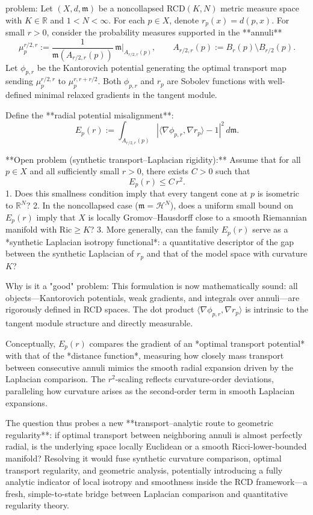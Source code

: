problem:  
Let \((X,d,\mathfrak{m})\) be a noncollapsed RCD\((K,N)\) metric measure space with \(K\in\mathbb{R}\) and \(1<N<\infty\).  
For each \(p\in X\), denote \(r_p(x)=d(p,x)\).  
For small \(r>0\), consider the probability measures supported in the **annuli**
\[
\mu_{p}^{r/2,r}:=\frac{1}{\mathfrak{m}(A_{r/2,r}(p))}\,\mathfrak{m}|_{A_{r/2,r}(p)},
\qquad
A_{r/2,r}(p):=B_r(p)\setminus B_{r/2}(p).
\]
Let \(\phi_{p,r}\) be the Kantorovich potential generating the optimal transport map sending \(\mu_{p}^{r/2,r}\) to \(\mu_{p}^{r,r+ r/2}\).  
Both \(\phi_{p,r}\) and \(r_p\) are Sobolev functions with well-defined minimal relaxed gradients in the tangent module.

Define the **radial potential misalignment**:
\[
E_p(r):=\int_{A_{r/2,r}(p)} |\langle \nabla \phi_{p,r}, \nabla r_p\rangle - 1|^2\, d\mathfrak{m}.
\]

**Open problem (synthetic transport–Laplacian rigidity):**  
Assume that for all \(p\in X\) and all sufficiently small \(r>0\),
there exists \(C>0\) such that
\[
E_p(r)\le C\,r^2 .
\]
1. Does this smallness condition imply that every tangent cone at \(p\) is isometric to \(\mathbb{R}^N\)?  
2. In the noncollapsed case (\(\mathfrak{m}=\mathcal{H}^N\)), does a uniform small bound on \(E_p(r)\) imply that \(X\) is locally Gromov–Hausdorff close to a smooth Riemannian manifold with \(\mathrm{Ric}\ge K\)?  
3. More generally, can the family \(E_p(r)\) serve as a *synthetic Laplacian isotropy functional*: a quantitative descriptor of the gap between the synthetic Laplacian of \(r_p\) and that of the model space with curvature \(K\)?

Why is it a "good" problem:  
This formulation is now mathematically sound: all objects—Kantorovich potentials, weak gradients, and integrals over annuli—are rigorously defined in RCD spaces. The dot product \(\langle\nabla \phi_{p,r},\nabla r_p\rangle\) is intrinsic to the tangent module structure and directly measurable. 

Conceptually, \(E_p(r)\) compares the gradient of an *optimal transport potential* with that of the *distance function*, measuring how closely mass transport between consecutive annuli mimics the smooth radial expansion driven by the Laplacian comparison. The \(r^2\)-scaling reflects curvature-order deviations, paralleling how curvature arises as the second-order term in smooth Laplacian expansions.

The question thus probes a new **transport–analytic route to geometric regularity**: if optimal transport between neighboring annuli is almost perfectly radial, is the underlying space locally Euclidean or a smooth Ricci-lower-bounded manifold? Resolving it would fuse synthetic curvature comparison, optimal transport regularity, and geometric analysis, potentially introducing a fully analytic indicator of local isotropy and smoothness inside the RCD framework—a fresh, simple-to-state bridge between Laplacian comparison and quantitative regularity theory.